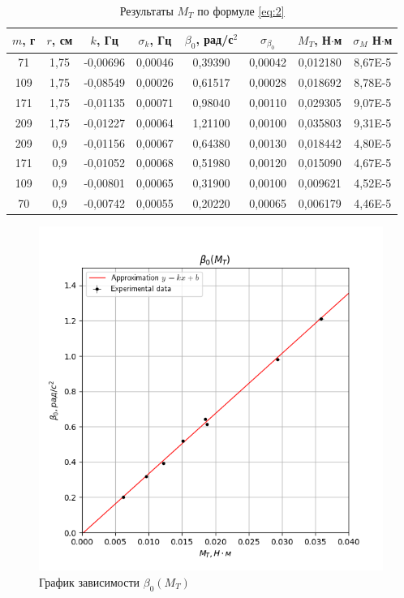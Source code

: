 \documentclass[a4paper,12pt]{article}
\begin{document}
	\begin{table}
		\centering
		\caption{Результаты $M_T$ по формуле \eqref{eq:2}}
		\small
		\begin{tabular}{|c|c|c|c|c|c|c|c|}
			\hline
			$m$, г & $r$, см & $k$, Гц & $\sigma_k$, Гц & $\beta_0$, рад/с$^2$ & $\sigma_{\beta_0}$ & $M_T$, Н$\cdot$м & $\sigma_M$ Н$\cdot$м \\
			\hline
			71 & 1,75 & -0,00696 & 0,00046 & 0,39390 & 0,00042 & 0,012180 & 8,67E-5 \\
			\hline
			109 & 1,75 & -0,08549 & 0,00026 & 0,61517 & 0,00028 & 0,018692 & 8,78E-5 \\
			\hline
			171 & 1,75 & -0,01135 & 0,00071 & 0,98040 & 0,00110 & 0,029305 & 9,07E-5 \\
			\hline
			209 & 1,75 & -0,01227 & 0,00064 & 1,21100 & 0,00100 & 0,035803 & 9,31E-5 \\
			\hline
			209 & 0,9 & -0,01156 & 0,00067 & 0,64380 & 0,00130 & 0,018442 & 4,80E-5 \\
			\hline
			171 & 0,9 & -0,01052 & 0,00068 & 0,51980 & 0,00120 & 0,015090 & 4,67E-5 \\
			\hline
			109 & 0,9 & -0,00801 & 0,00065 & 0,31900 & 0,00100 & 0,009621 & 4,52E-5 \\
			\hline
			70 & 0,9 & -0,00742 & 0,00055 & 0,20220 & 0,00065 & 0,006179 & 4,46E-5 \\
			\hline
		\end{tabular}
	\end{table}
	
	\begin{figure}[H]
		\centering
		\caption{График зависимости $\beta_0(M_T)$}
		\label{fig:2}
		\includegraphics[width=0.7\linewidth]{fig_1}
	\end{figure}
	
\end{document}
